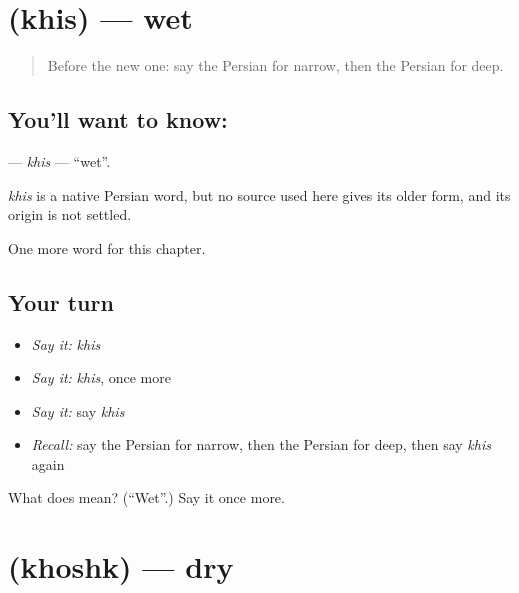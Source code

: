 \section[\texorpdfstring{\fa{خیس} (khis)}{خیس (khis)}]{ (khis) — wet}

\label{lesson:FA-C124-khis}



\begin{quote}
Before the new one: say the Persian for narrow, then the Persian for deep.
\end{quote}

\subsection*{You'll want to know: }
\textbf{} — \emph{khis} — \textquotedblleft{}wet\textquotedblright{}.

\begin{cousinweb}
\emph{khis} is a native Persian word, but no source used here gives its older form, and its origin is not settled.
\end{cousinweb}

\begin{grammarlens}[title={What you've built}]
One more word for this chapter.
\end{grammarlens}

\subsection*{Your turn}
\begin{itemize}
\raggedright
  \item \emph{Say it:} \emph{khis}
  \item \emph{Say it:} \emph{khis}, once more
  \item \emph{Say it:} say \emph{khis}
  \item \emph{Recall:} say the Persian for narrow, then the Persian for deep, then say \emph{khis} again
\end{itemize}

\begin{tcolorbox}[breakable,colback=teal!4,colframe=teal!35!black,title={Before you move on}]
What does  mean? (\textquotedblleft{}Wet\textquotedblright{}.) Say it once more.
\end{tcolorbox}
\section[\texorpdfstring{\fa{خشک} (khoshk)}{خشک (khoshk)}]{ (khoshk) — dry}

